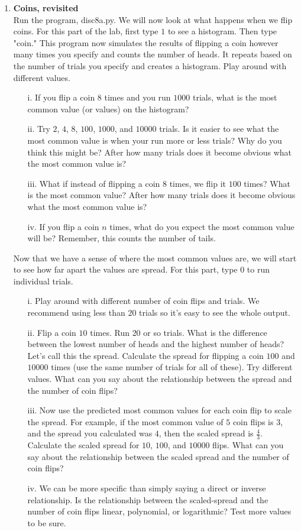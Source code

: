 \documentclass[11pt]{article}
\begin{document}
\begin{enumerate}


\item {\bf Coins, revisited}   \\
Run the program, disc8a.py. We will now look at what happens when we flip coins. For this part of the lab, first type $1$ to see a histogram. Then type "coin." This program now simulates the results of flipping a coin however many times you specify and counts the number of heads. It repeats based on the number of trials you specify and creates a histogram. Play around with different values.
\begin{enumerate}
\item[i.] If you flip a coin $8$ times and you run $1000$ trials, what is the most common value (or values) on the histogram? 
\item[ii.] Try $2$, $4$, $8$, $100$, $1000$, and $10000$ trials. Is it easier to see what the most common value is when your run more or less trials?  Why do you think this might be? After how many trials does it become obvious what the most common value is?
\item[iii.] What if instead of flipping a coin $8$ times, we flip it $100$ times? What is the most common value? After how many trials does it become obvious what the most common value is?
\item[iv.] If you flip a coin $n$ times, what do you expect the most common value will be? Remember, this counts the number of tails.
\end{enumerate}
Now that we have a sense of where the most common values are, we will start to see how far apart the values are spread. For this part, type $0$ to run individual trials. 
\begin{enumerate}
\item[i.] Play around with different number of coin flips and trials. We recommend using less than $20$ trials so it's easy to see the whole output.
\item[ii.] Flip a coin $10$ times. Run $20$ or so trials. What is the difference between the lowest number of heads and the highest number of heads? Let's call this the spread. Calculate the spread for flipping a coin $100$ and $10000$ times (use the same number of trials for all of these). Try different values. What can you say about the relationship between the spread and the number of coin flips?
\item[iii.] Now use the predicted most common values for each coin flip to scale the spread. For example, if the most common value of $5$ coin flips is $3$, and the spread you calculated was $4$, then the scaled spread is $\frac{4}{3}$. Calculate the scaled spread for $10$, $100$, and $10000$ flips. What can you say about the relationship between the scaled spread and the number of coin flips?
\item[iv.] We can be more specific than simply saying a direct or inverse relationship. Is the relationship between the scaled-spread and the number of coin flips linear, polynomial, or logarithmic? Test more values to be sure.
\end{enumerate}



\end{enumerate}
\end{document}
